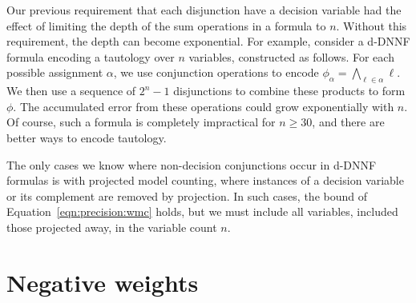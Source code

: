 \documentclass[letterpaper,USenglish,cleveref, autoref, thm-restate]{lipics-v2021}
\newcommand{\lit}{\ell}
\newcommand{\assign}{\alpha}
\begin{document}
Our previous requirement that each disjunction have a decision variable
had the effect of limiting the depth of the sum operations in a
formula to $n$.  Without this requirement, the depth can become exponential.
For example, consider a d-DNNF formula encoding a tautology over $n$
variables, constructed as follows.  For each possible assignment
$\assign$, we use conjunction operations to encode 
$\phi_{\assign} = \bigwedge_{\lit \in \assign} \lit$.  We then use a sequence of $2^n-1$ disjunctions to combine these products to form $\phi$.
The accumulated error from these operations could grow exponentially with $n$.
Of course, such a formula is completely impractical for $n \geq 30$, and there are better ways to encode tautology.

The only
cases we know where non-decision conjunctions occur in d-DNNF formulas is with projected model counting, where
instances of a decision variable or its complement are removed by projection.
In such cases, the bound of Equation~\ref{eqn:precision:wmc} holds,
but we must include all variables, included those projected away, in the
variable count $n$.

\section{Negative weights}
\end{document}
